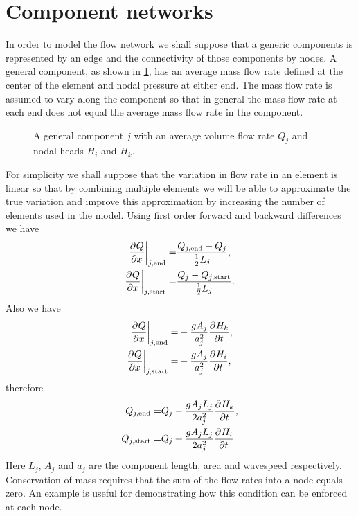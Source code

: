 \section{Component networks} \label{sec:component_networks}

In order to model the flow network we shall suppose that a generic components is represented by an edge and the connectivity of those components by nodes. A general component, as shown in \ref{fig:transient_element}, has an average mass flow rate defined at the center of the element and nodal pressure at either end. The mass flow rate is assumed to vary along the component so that in general the mass flow rate at each end does not equal the average mass flow rate in the component. 

\begin{figure}
\centering
{} 
\caption{A general component $j$ with an average volume flow rate $Q_j$ and nodal heads $H_i$ and $H_k$.}
\label{fig:transient_element}
\end{figure}

For simplicity we shall suppose that the variation in flow rate in an element is linear so that by combining multiple elements we will be able to approximate the true variation and improve this approximation by increasing the number of elements used in the model. Using first order forward and backward differences we have 
\begin{align}
\frac{\partial^{} Q}{\partial x^{}} \bigg\vert_{j,\text{end}} =& \frac{Q_{j,\text{end}} - Q_j}{\frac{1}{2}L_j}, \\
\frac{\partial^{} Q}{\partial x^{}} \bigg\vert_{j,\text{start}} =& \frac{Q_j - Q_{j,\text{start}}}{\frac{1}{2}L_j}. 
\end{align} 
Also we have 
\begin{align}
\frac{\partial^{} Q}{\partial x^{}} \bigg\vert_{j,\text{end}} =& -\frac{gA_j}{a_j^2} \frac{\partial^{} H_k}{\partial t^{}}, \\
\frac{\partial^{} Q}{\partial x^{}} \bigg\vert_{j,\text{start}} =& -\frac{gA_j}{a_j^2} \frac{\partial^{} H_i}{\partial t^{}}, 
\end{align}
therefore
\begin{align}
Q_{j,\text{end}} =& Q_j - \frac{gA_j L_j}{2 a_j^2} \frac{\partial^{} H_k}{\partial t^{}}, \\
Q_{j,\text{start}} =& Q_j + \frac{gA_j L_j}{2 a_j^2} \frac{\partial^{} H_i}{\partial t^{}}.
\end{align}
Here $L_j$, $A_j$ and $a_j$ are the component length, area and wavespeed respectively. Conservation of mass requires that the sum of the flow rates into a node equals zero. An example is useful for demonstrating how this condition can be enforced at each node. 

